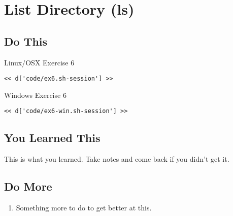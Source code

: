 \chapter{List Directory (ls)}

\section{Do This}

\begin{code}{Linux/OSX Exercise 6}
\begin{Verbatim}
<< d['code/ex6.sh-session'] >>
\end{Verbatim}
\end{code}

\begin{code}{Windows Exercise 6}
\begin{Verbatim}
<< d['code/ex6-win.sh-session'] >>
\end{Verbatim}
\end{code}

\section{You Learned This}

This is what you learned.  Take notes and come back if you didn't get it.

\section{Do More}

\begin{enumerate}
\item Something more to do to get better at this.
\end{enumerate}

